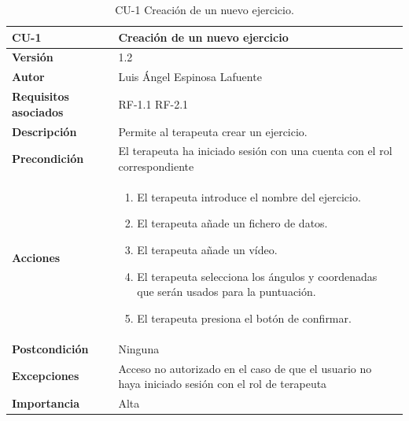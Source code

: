 \begin{table}[p]
	\centering
	\begin{tabularx}{\linewidth}{ p{} p{} }
		\toprule
		\textbf{CU-1}    & \textbf{Creación de un nuevo ejercicio}\\
		\toprule
		\textbf{Versión}              & 1.2    \\
		\textbf{Autor}                & Luis Ángel Espinosa Lafuente \\
		\textbf{Requisitos asociados} & RF-1.1 RF-2.1 \\
		\textbf{Descripción}          & Permite al terapeuta crear un ejercicio.  \\
		\textbf{Precondición}         & El terapeuta ha iniciado sesión con una cuenta con el rol correspondiente \\
		\textbf{Acciones}             &
		\begin{enumerate}
			\def\labelenumi{\arabic{enumi}.}
			\tightlist
			\item El terapeuta introduce el nombre del ejercicio.
			\item El terapeuta añade un fichero de datos.
			\item El terapeuta añade un vídeo.
			\item El terapeuta selecciona los ángulos y coordenadas que serán usados para la puntuación.
			\item El terapeuta presiona el botón de confirmar.
		\end{enumerate}\\
		\textbf{Postcondición}        & Ninguna \\
		\textbf{Excepciones}          & Acceso no autorizado en el caso de que el usuario no haya iniciado sesión con el rol de terapeuta  \\
		\textbf{Importancia}          & Alta \\
		\bottomrule
	\end{tabularx}
	\caption{CU-1 Creación de un nuevo ejercicio.}
\end{table}

